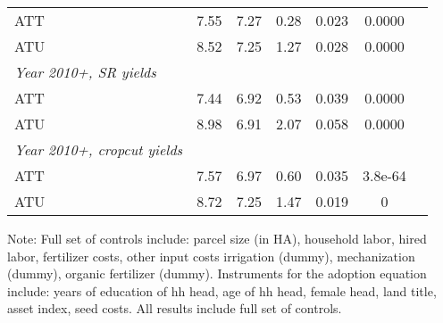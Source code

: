 \begin{table}[htbp]
\begin{threeparttable}
\begin{tabular}{l cccccc}
ATT         &        7.55&        7.27&        0.28&       0.023&      0.0000\\
%
%
%
ATU         &        8.52&        7.25&        1.27&       0.028&      0.0000\\
%
%
%
\textit{Year 2010+, SR yields}&            &            &            &            &            \\
ATT         &        7.44&        6.92&        0.53&       0.039&      0.0000\\
%
%
%
ATU         &        8.98&        6.91&        2.07&       0.058&      0.0000\\
%
%
%
\textit{Year 2010+, cropcut yields}&            &            &            &            &            \\
ATT         &        7.57&        6.97&        0.60&       0.035&     3.8e-64\\
%
%
%
ATU         &        8.72&        7.25&        1.47&       0.019&           0\\
\hline
\hline
\end{tabular}
\begin{tablenotes}
\footnotesize
\item{Note: Full set of controls include: parcel size (in HA), household labor, hired labor, fertilizer costs, other input costs irrigation (dummy), mechanization (dummy), organic fertilizer (dummy). Instruments for the adoption equation include: years of education of hh head, age of hh head, female head, land title, asset index, seed costs. All results include full set of controls. }
\end{tablenotes}
\end{threeparttable}
\end{table}
